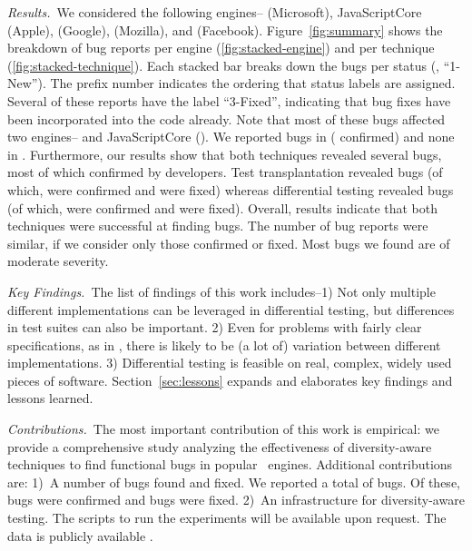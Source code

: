 \documentclass[smallextended]{svjour3}
\begin{document}
\sloppy \emph{Results.}~We considered the following engines--\chakra{}
(Microsoft), JavaScriptCore (Apple), \veight{} (Google),
\smonkey{} (Mozilla), and \hermes (Facebook). Figure~\ref{fig:summary} shows the breakdown of bug reports per engine (\ref{fig:stacked-engine}) and per technique
(\ref{fig:stacked-technique}).
Each stacked bar breaks down the bugs
per status (\eg{}, ``1-New''). The prefix number indicates the
ordering that status labels are assigned. Several of these
reports have the label ``3-Fixed'', indicating that bug fixes have
been incorporated into the code already. Note that most of these bugs
affected two engines--\chakra{} and JavaScriptCore (\jsc{}).  We
reported \noBugsBugsReportedGoogle{} bugs in \veight{}
(\noBugsBugsConfirmedGoogle{} confirmed) and none in \smonkey{}.
Furthermore, our results show that both techniques revealed several
bugs, most of which confirmed by developers. Test transplantation
revealed \noBugsTransplantation{} bugs (of which,
\noBugsTransplantationConfirmed{} were confirmed and
\noBugsTransplantationFixed{} were fixed) whereas differential testing
revealed \noBugsDifferentialTesting{} bugs (of which,
\noBugsDifferentialTestingConfirmed{} were confirmed and
\noBugsDifferentialTestingFixed{} were fixed).  Overall, results
indicate that both techniques were successful at finding bugs. The
number of bug reports were similar, if we consider only those
confirmed or fixed. Most bugs we found are of moderate severity.



\emph{Key Findings.}~The list of findings of this work includes--1)
Not only multiple different implementations can be leveraged in
differential testing, but differences in test suites can also be
important. 2) Even for problems with fairly clear specifications, as
in \javascript{}, there is likely to be (a lot of) variation between
different implementations. 3) Differential testing is feasible on
real, complex, widely used pieces of
software. Section~\ref{sec:lessons} expands and elaborates key
findings and lessons learned.

\emph{Contributions.}~The most important contribution of this work is empirical:
we provide a comprehensive study analyzing the effectiveness of diversity-aware
techniques to find functional bugs in popular \javascript\ engines.
Additional contributions are:
1)~A number of bugs found and fixed.
We reported a total of \totalBugsReported{} bugs.
Of these, \totalBugsConfirmed{} bugs were confirmed and \totalBugsFixed{} bugs were fixed.
2)~An infrastructure for diversity-aware testing.
The scripts to run the experiments will be available upon request.
The data is publicly available \dataRepo{}.
\end{document}
